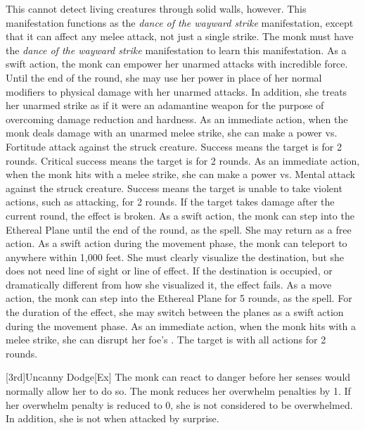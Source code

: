 This cannot detect living creatures through solid walls, however.
This \ki manifestation functions as the \textit{dance of the wayward strike} manifestation, except that it can affect any melee attack, not just a single strike.
The monk must have the \textit{dance of the wayward strike} \ki manifestation to learn this manifestation.
As a swift action, the monk can empower her unarmed attacks with incredible force.
Until the end of the round, she may use her \ki power in place of her normal modifiers to physical damage with her unarmed attacks.
In addition, she treats her unarmed strike as if it were an adamantine weapon for the purpose of overcoming damage reduction and hardness.
As an immediate action, when the monk deals damage with an unarmed melee strike, she can make a \Ki power vs. Fortitude attack against the struck creature.
Success means the target is \staggered for 2 rounds.
Critical success means the target is \stunned for 2 rounds.
\norepeatnotes
{}
As an immediate action, when the monk hits with a melee strike, she can make a \Ki power vs. Mental attack against the struck creature.
Success means the target is unable to take violent actions, such as attacking, for 2 rounds.
If the target takes damage after the current round, the effect is broken.
As a swift action, the monk can step into the Ethereal Plane until the end of the round, as the  spell.
She may return as a free action.
As a swift action during the movement phase, the monk can teleport to anywhere within 1,000 feet.
She must clearly visualize the destination, but she does not need line of sight or line of effect.
If the destination is occupied, or dramatically different from how she visualized it, the effect fails.
 As a move action, the monk can step into the Ethereal Plane for 5 rounds, as the 
spell.
For the duration of the effect, she may switch between the planes as a swift action during the movement phase.
As an immediate action, when the monk hits with a melee strike, she can disrupt her foe's \ki.
The target is \severelyimpaired with all actions for 2 rounds.

[3rd]{Uncanny Dodge}[Ex]
The monk can react to danger before her senses would normally allow her to do so.
The monk reduces her overwhelm penalties by 1.
If her overwhelm penalty is reduced to 0, she is not considered to be overwhelmed.
In addition, she is not \unaware when attacked by surprise.

